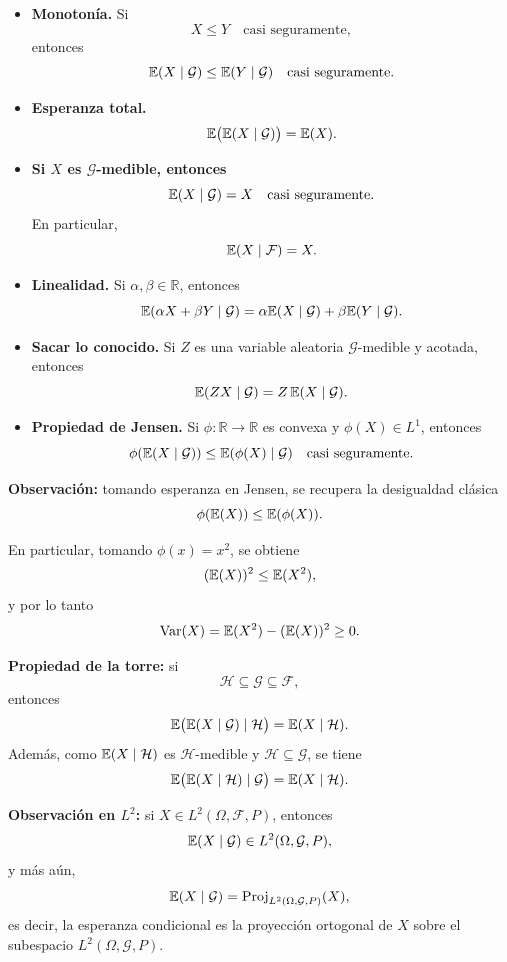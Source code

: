 \begin{itemize}
\item[(1)] \textbf{Monotonía.} Si
\[
X\leq Y \quad \text{casi seguramente},
\]
entonces
\[
\mathbb{E}(X\mid\mathcal{G})\leq \mathbb{E}(Y\mid\mathcal{G})
\quad \text{casi seguramente}.
\]

\item[(2)] \textbf{Esperanza total.}
\[
\mathbb{E}\big(\mathbb{E}(X\mid\mathcal{G})\big)=\mathbb{E}(X).
\]

\item[(3)] \textbf{Si \(X\) es \(\mathcal{G}\)-medible, entonces}
\[
\mathbb{E}(X\mid\mathcal{G})=X
\quad \text{casi seguramente}.
\]
En particular,
\[
\mathbb{E}(X\mid\mathcal{F})=X.
\]

\item[(4)] \textbf{Linealidad.} Si \(\alpha,\beta\in\mathbb{R}\), entonces
\[
\mathbb{E}(\alpha X+\beta Y\mid\mathcal{G})
=
\alpha \mathbb{E}(X\mid\mathcal{G})
+
\beta \mathbb{E}(Y\mid\mathcal{G}).
\]

\item[(5)] \textbf{Sacar lo conocido.} Si \(Z\) es una variable aleatoria \(\mathcal{G}\)-medible y acotada, entonces
\[
\mathbb{E}(ZX\mid\mathcal{G})=Z\,\mathbb{E}(X\mid\mathcal{G}).
\]

\item[(6)] \textbf{Propiedad de Jensen.} Si \(\phi:\mathbb{R}\to\mathbb{R}\) es convexa y \(\phi(X)\in L^1\), entonces
\[
\phi(\mathbb{E}(X\mid\mathcal{G}))
\leq
\mathbb{E}(\phi(X)\mid\mathcal{G})
\quad \text{casi seguramente}.
\]
\end{itemize}

\medskip

\noindent
\textbf{Observación:} tomando esperanza en Jensen, se recupera la desigualdad clásica
\[
\phi(\mathbb{E}(X))\leq \mathbb{E}(\phi(X)).
\]

En particular, tomando \(\phi(x)=x^2\), se obtiene
\[
(\mathbb{E}(X))^2\leq \mathbb{E}(X^2),
\]
y por lo tanto
\[
\mathrm{Var}(X)=\mathbb{E}(X^2)-(\mathbb{E}(X))^2\geq 0.
\]

\medskip

\noindent
\textbf{Propiedad de la torre:} si
\[
\mathcal{H}\subseteq\mathcal{G}\subseteq\mathcal{F},
\]
entonces
\[
\mathbb{E}\big(\mathbb{E}(X\mid\mathcal{G})\mid\mathcal{H}\big)=\mathbb{E}(X\mid\mathcal{H}).
\]
Además, como \(\mathbb{E}(X\mid\mathcal{H})\) es \(\mathcal{H}\)-medible y \(\mathcal{H}\subseteq\mathcal{G}\), se tiene
\[
\mathbb{E}\big(\mathbb{E}(X\mid\mathcal{H})\mid\mathcal{G}\big)=\mathbb{E}(X\mid\mathcal{H}).
\]

\medskip

\noindent
\textbf{Observación en \(L^2\):} si \(X\in L^2(\Omega,\mathcal{F},P)\), entonces
\[
\mathbb{E}(X\mid\mathcal{G})\in L^2(\Omega,\mathcal{G},P),
\]
y más aún,
\[
\mathbb{E}(X\mid\mathcal{G})
=
\operatorname{Proj}_{L^2(\Omega,\mathcal{G},P)}(X),
\]
es decir, la esperanza condicional es la proyección ortogonal de \(X\) sobre el subespacio \(L^2(\Omega,\mathcal{G},P)\).


